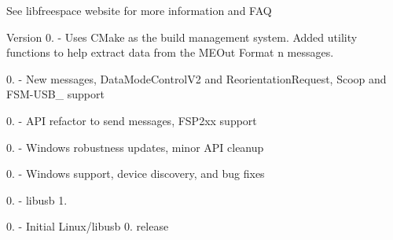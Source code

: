 See libfreespace website for more information and F\+AQ

\begin{DoxyVersion}{Version}
0. -\/ Uses C\+Make as the build management system. Added utility functions to help extract data from the M\+E\+Out Format n messages. 

0. -\/ New messages, Data\+Mode\+Control\+V2 and Reorientation\+Request, Scoop and F\+S\+M-\/\+U\+S\+B\+\_ support 

0. -\/ A\+PI refactor to send messages, F\+S\+P2xx support 

0. -\/ Windows robustness updates, minor A\+PI cleanup 

0. -\/ Windows support, device discovery, and bug fixes 

0. -\/ libusb 1. 

0. -\/ Initial Linux/libusb 0. release 
\end{DoxyVersion}
